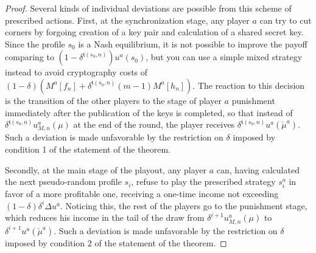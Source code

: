 \begin{proof}[Proof]
	Several kinds of individual deviations are possible from this scheme of prescribed actions. First, at the synchronization stage, any player $a$ can try to cut corners by forgoing creation of a key pair and calculation of a shared secret key. Since the profile $s_0$ is a Nash equilibrium, it is not possible to improve the payoff comparing to $(1 - \delta^{\mathfrak{t}(s_0, n)}) u^a(s_0)$, but you can use a simple mixed strategy instead to avoid cryptography costs of $(1 - \delta) (M^a[f_n] + \delta^{\mathfrak{t}(s_0, n)} (m - 1) M^a[h_n])$. The reaction to this decision is the transition of the other players to the stage of player $a$ punishment immediately after the publication of the keys is completed, so that instead of $\delta^{\mathfrak{t}(s_0, n)} u_{M,n}^a(\mu)$ at the end of the round, the player receives $\delta^{\mathfrak{t}(s_0, n)} u^a(\check{\mu}^a)$. Such a deviation is made unfavorable by the restriction on $\delta$ imposed by condition 1 of the statement of the theorem. %
	
	Secondly, at the main stage of the playout, any player $a$ can, having calculated the next pseudo-random profile $s_i$, refuse to play the prescribed strategy $s_i^a$ in favor of a more profitable one, receiving a one-time income not exceeding $(1 - \delta) \delta^i \Delta u^a$. Noticing this, the rest of the players go to the punishment stage, which reduces his income in the tail of the draw from $\delta^{i+1} u_{M,n}^a(\mu)$ to $\delta^{i+1} u^a(\check{\mu}^a)$. Such a deviation is made unfavorable by the restriction on $\delta$ imposed by condition 2 of the statement of the theorem. %
	

\end{proof}
